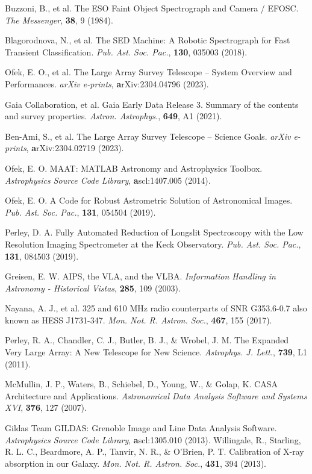 \documentclass{nature_plusfigure}
\newcommand{\mn}{{Mon. Not. R. Astron. Soc.}}
\newcommand{\mnras}{\mn}
\newcommand{\apjl}{{Astrophys. J. Lett.}}
\newcommand{\aap}{{Astron. Astrophys.}}
\newcommand{\pasp}{{Pub. Ast. Soc. Pac.}}
\begin{document}
\begin{methods}
\begin{thebibliography}{10}
 Buzzoni, B., et al. The ESO Faint Object Spectrograph and Camera / EFOSC. \emph{The Messenger}, \textbf{38}, 9 (1984). 

  Blagorodnova, N., et al. The SED Machine: A Robotic Spectrograph for Fast Transient Classification. \emph{\pasp}, \textbf{130}, 035003 (2018). 

  Ofek, E. O., et al. The Large Array Survey Telescope -- System Overview and Performances. \emph{arXiv e-prints}, \textbf arXiv:2304.04796 (2023). 
 
  Gaia Collaboration, et al. Gaia Early Data Release 3. Summary of the contents and survey properties. \emph{\aap}, \textbf{649}, A1 (2021). 

 Ben-Ami, S., et al. The Large Array Survey Telescope -- Science Goals. \emph{arXiv e-prints}, \textbf arXiv:2304.02719 (2023). 

 Ofek, E. O. MAAT: MATLAB Astronomy and Astrophysics Toolbox. \emph{Astrophysics Source Code Library}, \textbf ascl:1407.005 (2014). 

 Ofek, E. O. A Code for Robust Astrometric Solution of Astronomical Images. \emph{\pasp}, \textbf{131}, 054504 (2019). 

 Perley, D. A. Fully Automated Reduction of Longslit Spectroscopy with the Low Resolution Imaging Spectrometer at the Keck Observatory. \emph{\pasp}, \textbf{131}, 084503 (2019). 


  Greisen, E. W. AIPS, the VLA, and the VLBA. \emph{Information Handling in Astronomy - Historical Vistas}, \textbf{285}, 109 (2003). 

 Nayana, A. J., et al. 325 and 610 MHz radio counterparts of SNR G353.6-0.7 also known as HESS J1731-347. \emph{\mnras}, \textbf{467}, 155 (2017). 

 Perley, R. A., Chandler, C. J., Butler, B. J., \& Wrobel, J. M. The Expanded Very Large Array: A New Telescope for New Science. \emph{\apjl}, \textbf{739}, L1 (2011). 

 McMullin, J. P., Waters, B., Schiebel, D., Young, W., \& Golap, K. CASA Architecture and Applications. \emph{Astronomical Data Analysis Software and Systems XVI}, \textbf{376}, 127 (2007). 

 Gildas Team GILDAS: Grenoble Image and Line Data Analysis Software. \emph{Astrophysics Source Code Library}, \textbf ascl:1305.010 (2013). 
 Willingale, R., Starling, R. L. C., Beardmore, A. P., Tanvir, N. R., \& O'Brien, P. T. Calibration of X-ray absorption in our Galaxy. \emph{\mnras}, \textbf{431}, 394 (2013). 


\end{thebibliography}
\end{methods}
\end{document}

